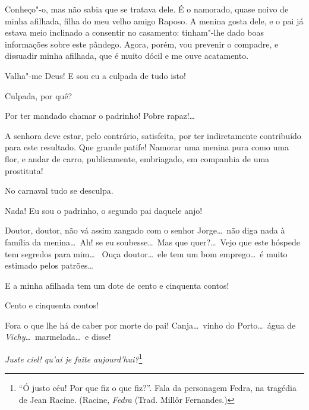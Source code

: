  Conheço"-o, mas não sabia que se tratava dele. É o namorado,
quase noivo de minha afilhada, filha do meu velho amigo Raposo. A
menina gosta dele, e o pai já estava meio inclinado a consentir no
casamento: tinham"-lhe dado boas informações sobre este pândego. Agora,
porém, vou prevenir o compadre, e dissuadir minha afilhada, que é muito
dócil e me ouve acatamento.

 Valha"-me Deus! E sou eu a culpada de tudo isto!

 Culpada, por quê?

 Por ter mandado chamar o padrinho! Pobre rapaz!\ldots

 A senhora deve estar, pelo contrário, satisfeita, por ter
indiretamente contribuído para este resultado.  Que grande patife! Namorar uma menina pura como uma
flor, e andar de carro, publicamente, embriagado, em companhia de uma
prostituta!

 No carnaval tudo se desculpa.

 Nada! Eu sou o padrinho, o segundo pai daquele anjo!

  Doutor, doutor, não vá
assim zangado com o senhor Jorge\ldots\ não diga nada à família da
menina\ldots\ Ah! se eu soubesse\ldots\ Mas que quer?\ldots\ Vejo que este hóspede
tem segredos para mim\ldots\  Ouça
doutor\ldots\ ele tem um bom emprego\ldots\ é muito estimado pelos patrões\ldots

 E a minha afilhada tem um dote de cento e cinquenta contos!

  Cento e
cinquenta contos!

  Fora o que lhe há de caber por morte do
pai!  Canja\ldots\ vinho
do Porto\ldots\ água de \textit{Vichy}\ldots\ marmelada\ldots\ e disse!



  \textit{Juste ciel! qu’ai je faite aujourd’hui?}\footnote{
“Ó justo céu! Por que fiz o que fiz?”. Fala da personagem Fedra, na tragédia de
Jean Racine. (Racine, \textit{Fedra} (Trad. Millôr Fernandes.)}

